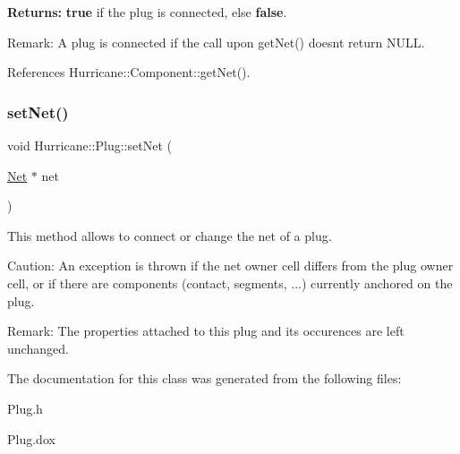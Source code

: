{\bfseries Returns\+:} {\bfseries true} if the plug is connected, else {\bfseries false}.

\begin{DoxyParagraph}{Remark\+: A plug is connected if the call upon get\+Net() doesn\textquotesingle{}t }
return N\+U\+LL. 
\end{DoxyParagraph}


References Hurricane\+::\+Component\+::get\+Net().

\mbox{\label{classHurricane_1_1Plug_af5a0448a5cb0c4956f2f1b28f9c87530}} 
\subsubsection{\texorpdfstring{set\+Net()}{setNet()}}
{\footnotesize\ttfamily void Hurricane\+::\+Plug\+::set\+Net (\begin{DoxyParamCaption}\item[{\mbox{\hyperlink{classHurricane_1_1Net}{Net}} $\ast$}]{net }\end{DoxyParamCaption})}

This method allows to connect or change the net of a plug.

\begin{DoxyParagraph}{Caution\+: An exception is thrown if the net owner cell differs from the }
plug owner cell, or if there are components (contact, segments, ...) currently anchored on the plug.
\end{DoxyParagraph}
\begin{DoxyParagraph}{Remark\+: The properties attached to this plug and its occurences are }
left unchanged. 
\end{DoxyParagraph}


The documentation for this class was generated from the following files\+:\begin{DoxyCompactItemize}
\item 
Plug.\+h\item 
Plug.\+dox\end{DoxyCompactItemize}
